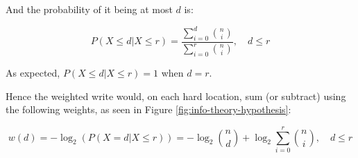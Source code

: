 And the probability of it being at most $d$ is:

$$
P(X \leq d | X \leq r) = \frac{\sum_{i=0}^{d} \binom{n}{i}}{\sum_{i=0}^{r} \binom{n}{i}}, \quad d \leq r
$$

As expected, $P(X \leq d | X \leq r) = 1$ when $d = r$.

Hence the weighted write would, on each hard location, sum (or subtract) using the following weights, as seen in Figure \ref{fig:info-theory-hypothesis}:

$$
w(d) = -\log_2 \left( P(X = d | X \leq r) \right) = - \log_2 \binom{n}{d} + \log_2 \sum_{i=0}^{r} \binom{n}{i}, \quad d \leq r
$$

\begin{figure}[h!]
  \centering




\end{figure}
